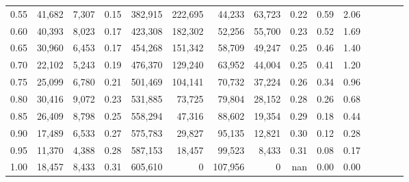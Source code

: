 \begin{tabular}{rrrcrrrrrrrrrrr}
0.55 &  41,682 &  7,307 &                                       0.15 &  382,915 &  222,695 &   44,233 &   63,723 &  0.22 &  0.59 &                         2.06 \\
0.60 &  40,393 &  8,023 &                                       0.17 &  423,308 &  182,302 &   52,256 &   55,700 &  0.23 &  0.52 &                         1.69 \\
0.65 &  30,960 &  6,453 &                                       0.17 &  454,268 &  151,342 &   58,709 &   49,247 &  0.25 &  0.46 &                         1.40 \\
0.70 &  22,102 &  5,243 &                                       0.19 &  476,370 &  129,240 &   63,952 &   44,004 &  0.25 &  0.41 &                         1.20 \\
0.75 &  25,099 &  6,780 &                                       0.21 &  501,469 &  104,141 &   70,732 &   37,224 &  0.26 &  0.34 &                         0.96 \\
0.80 &  30,416 &  9,072 &                                       0.23 &  531,885 &   73,725 &   79,804 &   28,152 &  0.28 &  0.26 &                         0.68 \\
0.85 &  26,409 &  8,798 &                                       0.25 &  558,294 &   47,316 &   88,602 &   19,354 &  0.29 &  0.18 &                         0.44 \\
0.90 &  17,489 &  6,533 &                                       0.27 &  575,783 &   29,827 &   95,135 &   12,821 &  0.30 &  0.12 &                         0.28 \\
0.95 &  11,370 &  4,388 &                                       0.28 &  587,153 &   18,457 &   99,523 &    8,433 &  0.31 &  0.08 &                         0.17 \\
1.00 &  18,457 &  8,433 &                                       0.31 &  605,610 &        0 &  107,956 &        0 &   nan &  0.00 &                         0.00 \\
\bottomrule
\end{tabular}
